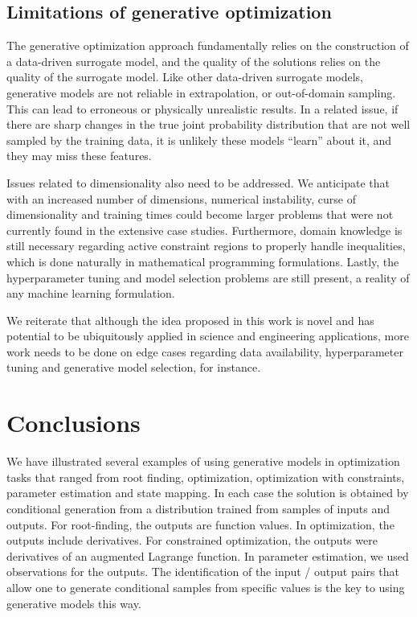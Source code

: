 \documentclass{achemso}
\begin{document}
\subsection{Limitations of generative optimization}

The generative optimization approach fundamentally relies on the construction of a data-driven surrogate model, and the quality of the solutions relies on the quality of the surrogate model. Like other data-driven surrogate models, generative models are not reliable in extrapolation, or out-of-domain sampling. This can lead to erroneous or physically unrealistic results. In a related issue, if there are sharp changes in the true joint probability distribution that are not well sampled by the training data, it is unlikely these models ``learn'' about it, and they may miss these features. 

Issues related to dimensionality also need to be addressed. We anticipate that with an increased number of dimensions, numerical instability, curse of dimensionality and training times could become larger problems that were not currently found in the extensive case studies. Furthermore, domain knowledge is still necessary regarding active constraint regions to properly handle inequalities, which is done naturally in mathematical programming formulations. Lastly, the hyperparameter tuning and model selection problems are still present, a reality of any machine learning formulation.

We reiterate that although the idea proposed in this work is novel and has potential to be ubiquitously applied in science and engineering applications, more work needs to be done on edge cases regarding data availability, hyperparameter tuning and generative model selection, for instance.

\section{Conclusions} \label{sec:conclusions}

We have illustrated several examples of using generative models in optimization tasks that ranged from root finding, optimization, optimization with constraints, parameter estimation and state mapping. In each case the solution is obtained by conditional generation from a distribution trained from samples of inputs and outputs. For root-finding, the outputs are function values. In optimization, the outputs include derivatives. For constrained optimization, the outputs were derivatives of an augmented Lagrange function. In parameter estimation, we used observations for the outputs. The identification of the input / output pairs that allow one to generate conditional samples from specific values is the key to using generative models this way.
\end{document}
